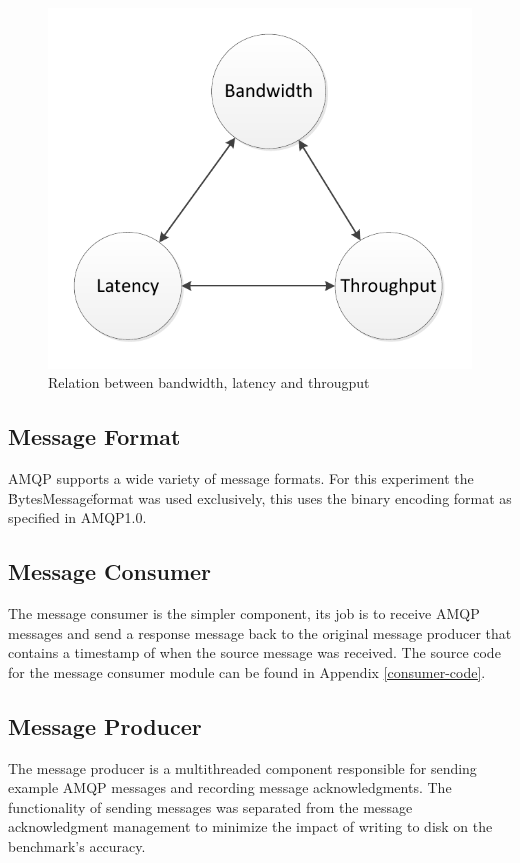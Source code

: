 \documentclass{thesis}
\begin{document}
\begin{figure}[h]
\centering
\includegraphics[scale=.75]{bandwidth_latency_throughput}  
\caption{Relation between bandwidth, latency and througput}
\end{figure}

\subsection{Message Format}
AMQP supports a wide variety of message formats.  For this experiment the \"BytesMessage\" format was used exclusively, this uses the binary encoding format as specified in AMQP1.0.  

\subsection{Message Consumer}
The message consumer is the simpler component, its job is to receive AMQP messages and send a response message back to the original message producer that contains a timestamp of when the source message was received.  The source code for the message consumer module can be found in Appendix \ref{consumer-code}.

\subsection{Message Producer}
The message producer is a multithreaded component responsible for sending example AMQP messages and recording message acknowledgments.  The functionality of sending messages was separated from the message acknowledgment management to minimize the impact of writing to disk on the benchmark's accuracy.  
\end{document}
